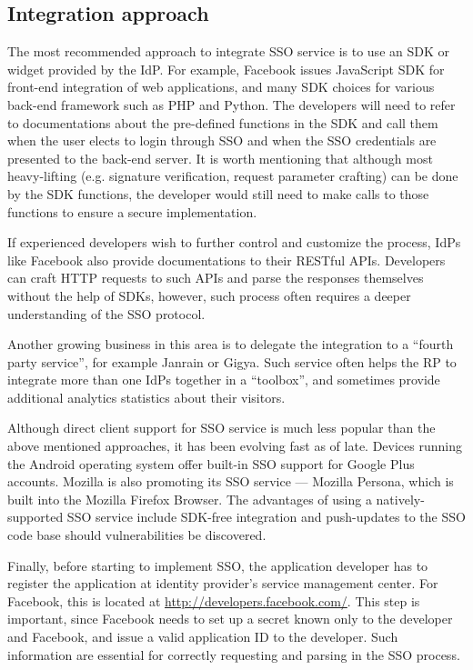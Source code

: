 \subsection{Integration approach}

The most recommended approach to integrate SSO service is to use an SDK or widget provided by the IdP.  For example, Facebook issues JavaScript SDK for front-end integration of web applications, and many SDK choices for various back-end framework such as PHP and Python.  The developers will need to refer to documentations about the pre-defined functions in the SDK and call them when the user elects to login through SSO and when the SSO credentials are presented to the back-end server.  It is worth mentioning that although most heavy-lifting (e.g. signature verification, request parameter crafting) can be done by the SDK functions, the developer would still need to make calls to those functions to ensure a secure implementation.

If experienced developers wish to further control and customize the process, IdPs like Facebook also provide documentations to their RESTful APIs.  Developers can craft HTTP requests to such APIs and parse the responses themselves without the help of SDKs, however, such process often requires a deeper understanding of the SSO protocol.

Another growing business in this area is to delegate the integration to a ``fourth party service'', for example Janrain or Gigya.  Such service often helps the RP to integrate more than one IdPs together in a ``toolbox'', and sometimes provide additional analytics statistics about their visitors.  

Although direct client support for SSO service is much less popular than the above mentioned approaches, it has been evolving fast as of late.  Devices running the Android operating system offer built-in SSO support for Google Plus accounts.  Mozilla is also promoting its SSO service --- Mozilla Persona, which is built into the Mozilla Firefox Browser.  The advantages of using a natively-supported SSO service include SDK-free integration and push-updates to the SSO code base should vulnerabilities be discovered.

Finally, before starting to implement SSO, the application developer has to register the application at identity provider's service management center.  For Facebook, this is located at \url{http://developers.facebook.com/}.  This step is important, since Facebook needs to set up a secret known only to the developer and Facebook, and issue a valid application ID to the developer.  Such information are essential for correctly requesting and parsing in the SSO process.

